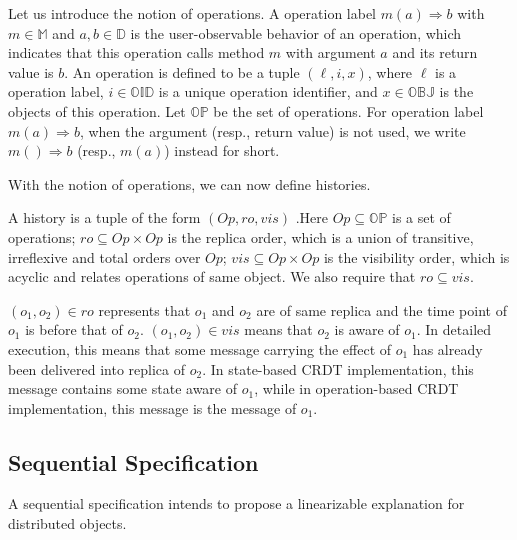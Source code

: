 Let us introduce the notion of operations. A operation label $m(a) \Rightarrow b$ with $m \in \mathbb{M}$ and $a,b \in \mathbb{D}$ is the user-observable behavior of an operation, which indicates that this operation calls method $m$ with argument $a$ and its return value is $b$. An operation is defined to be a tuple $(\ell,i,x)$, where $\ell$ is a operation label, $i \in \mathbb{OID}$ is a unique operation identifier, and $x \in \mathbb{OBJ}$ is the objects of this operation. Let $\mathbb{OP}$ be the set of operations. For operation label $m(a) \Rightarrow b$, when the argument (resp., return value) is not used, we write $m()\Rightarrow b$ (resp., $m(a)$) instead for short. 

With the notion of operations, we can now define histories.  

\begin{definition}[histories]
\label{definition:histories}
A history is a tuple of the form $(\mathit{Op},\mathit{ro},\mathit{vis})$ .Here $\mathit{Op} \subseteq \mathbb{OP}$ is a set of operations; $\mathit{ro} \subseteq \mathit{Op} \times \mathit{Op}$ is the replica order, which is a union of transitive, irreflexive and total orders over $\mathit{Op}$; $\mathit{vis} \subseteq \mathit{Op} \times \mathit{Op}$ is the visibility order, which is acyclic and relates operations of same object. We also require that $\mathit{ro} \subseteq \mathit{vis}$.
\end{definition} 

$(o_1,o_2) \in \mathit{ro}$ represents that $o_1$ and $o_2$ are of same replica and the time point of $o_1$ is before that of $o_2$. $(o_1,o_2) \in \mathit{vis}$ means that $o_2$ is aware of $o_1$. In detailed execution, this means that some message carrying the effect of $o_1$ has already been delivered into replica of $o_2$. In state-based CRDT implementation, this message contains some state aware of $o_1$, while in operation-based CRDT implementation, this message is the message of $o_1$. 





\subsection{Sequential Specification}
\label{subsec:sequential specification} 

A sequential specification intends to propose a linearizable explanation for distributed objects. 

